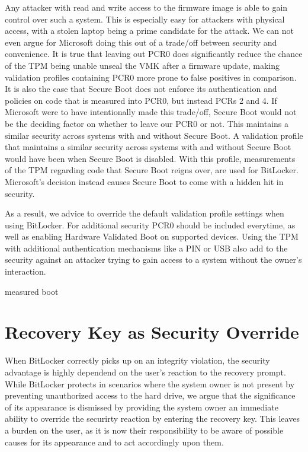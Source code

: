 Any attacker with read and write access to the firmware image is able to gain control over such a system.
This is especially easy for attackers with physical access, with a stolen laptop being a prime candidate for the attack.
We can not even argue for Microsoft doing this out of a trade\-/off between security and convenience.
It is true that leaving out \ac{PCR}0 does significantly reduce the chance of the \ac{TPM} being unable unseal the \ac{VMK} after a firmware update, making validation profiles containing \ac{PCR}0 more prone to false positives in comparison.
It is also the case that Secure Boot does not enforce its authentication and policies on code that is measured into \ac{PCR}0, but instead \acp{PCR} 2 and 4.
If Microsoft were to have intentionally made this trade\-/off, Secure Boot would not be the deciding factor on whether to leave our \ac{PCR}0 or not.
This maintains a similar security across systems with and without Secure Boot.
A validation profile that maintains a similar security across systems with and without Secure Boot would have been  when Secure Boot is disabled.
With this profile, measurements of the \ac{TPM} regarding code that Secure Boot reigns over, are used for BitLocker.
Microsoft's decision instead causes Secure Boot to come with a hidden hit in security.

As a result, we advice to override the default validation profile settings when using BitLocker.
For additional security \ac{PCR}0 should be included everytime, as well as enabling Hardware Validated Boot on supported devices.
Using the \ac{TPM} with additional authentication mechanisms like a \ac{PIN} or \ac{USB} also add to the security against an attacker trying to gain access to a system without the owner's interaction.

measured boot 


\section*{Recovery Key as Security Override}

When BitLocker correctly picks up on an integrity violation, the security advantage is highly dependend on the user's reaction to the recovery prompt.
While BitLocker protects in scenarios where the system owner is not present by preventing unauthorized access to the hard drive, we argue that the significance of its appearance is dismissed by providing the system owner an immediate ability to override the securirty reaction by entering the recovery key.
This leaves a burden on the user, as it is now their responsibility to be aware of possible causes for its appearance and to act accordingly upon them.

